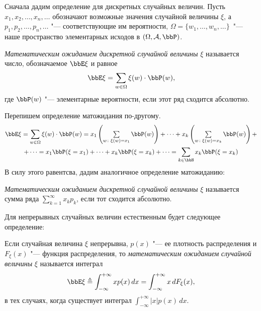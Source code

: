 Сначала дадим определение для дискретных случайных величин. Пусть $x_1,x_2,\dots,x_n,\dots$ обозначают возможные значения случайной величины $\xi$, а $p_1,p_2,\dots,p_n,\dots$ "--- соответствующие им вероятности, $\Omega = \{w_1,\dots, w_n,...\}$~"--- наше пространство элементарных исходов в $(\Omega,\mathcal A, \bbP)$.
\begin{defn}\label{teorver1}
\textit{Математическим ожиданием дискретной случайной величины} $\xi$ называется число, обозначаемое $\bbE\xi$ и равное
\begin{equation}
\bbE\xi = \sum_{w \in \Omega} \xi(w)\cdot \bbP(w),
\end{equation}
где $\bbP(w)$ "--- элементарные вероятности, если этот ряд сходится абсолютно.
\end{defn}
Перепишем определение матожидания по-другому.
\begin{multline*}
\bbE\xi=\sum_{w \in \Omega} \xi(w)\cdot \bbP(w)=x_1\left(\textstyle\sum\limits_{w\colon \xi(w)=x_1} \bbP(w)\right)+\dots+x_k\left(\textstyle\sum\limits_{w\colon \xi(w)=x_k} \bbP(w)\right)+\\+\dots =x_1\bbP(\xi=x_1)+\dots+ x_k\bbP(\xi=x_k)+\dots=\sum_{k\in \bbN} x_k\bbP(\xi=x_k)
\end{multline*}
В силу этого равентсва, дадим аналогичное определение матожиданию:
\begin{defnn}\label{teorver1s}
\textit{Математическим ожиданием дискретной случайной величины} $\xi$ называется сумма ряда $\sum\limits_{k=1}^{\infty}x_k p_k$, если тот сходится абсолютно.
\end{defnn}


Для непрерывных случайных величин естественным будет следующее определение: 
\begin{defn} 
Если случайная величина $\xi$ непрерывна, $p(x)$ "--- ее плотность распределения и $F_\xi(x)$ "--- функция распределения,  то \textit{математическим ожиданием} \textit{случайной величины} $\xi$ называется интеграл
\begin{equation}
\bbE\xi\triangleq\int_{-\infty}^{+\infty} xp(x)\,dx = \int_{-\infty}^{+\infty} x\,dF_\xi(x),
\end{equation}
в тех случаях, когда существует интеграл $\int_{-\infty}^{+\infty} |x|p(x)\,dx.$ 
\end{defn}



